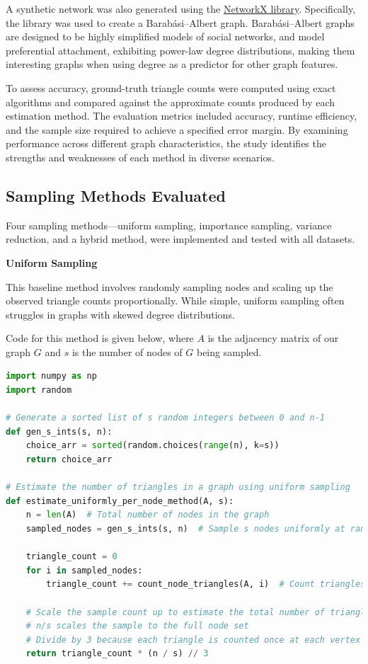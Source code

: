 \documentclass[11pt, margin=1in]{article}
\begin{document}
A synthetic network was also generated using the \href{https://networkx.org/}{NetworkX library}.
Specifically, the library was used to create a Barabási–Albert \cite{albert_statistical_2002} graph.
Barabási–Albert graphs are designed to be highly simplified models of social networks, and model preferential attachment, exhibiting power-law degree distributions, making them interesting graphs when using degree as a predictor for other graph features.

To assess accuracy, ground-truth triangle counts were computed using exact algorithms and compared against the approximate counts produced by each estimation method.
The evaluation metrics included accuracy, runtime efficiency, and the sample size required to achieve a specified error margin.
By examining performance across different graph characteristics, the study identifies the strengths and weaknesses of each method in diverse scenarios.

\subsection{Sampling Methods Evaluated}

Four sampling methods—uniform sampling, importance sampling, variance reduction, and a hybrid method, were implemented and tested with all datasets.

\textbf{Uniform Sampling}

This baseline method involves randomly sampling nodes and scaling up the observed triangle counts proportionally.
While simple, uniform sampling often struggles in graphs with skewed degree distributions.

Code for this method is given below, where $A$ is the adjacency matrix of our graph $G$ and $s$ is the number of nodes of $G$ being sampled.

{
\singlespacing
\begin{lstlisting}[language=Python]
import numpy as np
import random

# Generate a sorted list of s random integers between 0 and n-1
def gen_s_ints(s, n):
    choice_arr = sorted(random.choices(range(n), k=s))
    return choice_arr

# Estimate the number of triangles in a graph using uniform sampling
def estimate_uniformly_per_node_method(A, s):
    n = len(A)  # Total number of nodes in the graph
    sampled_nodes = gen_s_ints(s, n)  # Sample s nodes uniformly at random

    triangle_count = 0
    for i in sampled_nodes:
        triangle_count += count_node_triangles(A, i)  # Count triangles involving node i

    # Scale the sample count up to estimate the total number of triangles
    # n/s scales the sample to the full node set
    # Divide by 3 because each triangle is counted once at each vertex
    return triangle_count * (n / s) // 3
\end{lstlisting}
}
\end{document}
